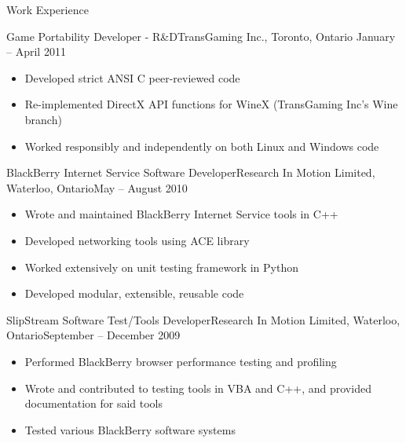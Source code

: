 \documentclass[11pt]{article}
\begin{document}
	\begin{section}{Work Experience} \\

        \begin{subsection}{Game Portability Developer - R\&D}{TransGaming Inc., Toronto, Ontario%
            }{January -- April 2011}

            \begin{itemize}
                \item Developed strict ANSI C peer-reviewed code
                \item Re-implemented DirectX API functions for WineX (TransGaming Inc's Wine branch) %
                \item Worked responsibly and independently on both Linux and Windows code
            \end{itemize}

        \end{subsection}

        \begin{subsection}{BlackBerry Internet Service Software Developer}{Research In Motion Limited, Waterloo, Ontario}{May -- August 2010}

            \begin{itemize}
                \item Wrote and maintained BlackBerry Internet Service tools in C++
                \item Developed networking tools using ACE library
                \item Worked extensively on unit testing framework in Python
                \item Developed modular, extensible, reusable code
            \end{itemize}

        \end{subsection}

		\begin{subsection}{SlipStream Software Test/Tools Developer}{Research In Motion Limited, Waterloo, Ontario}{September -- December 2009}

			\begin{itemize}
				\item Performed BlackBerry browser performance testing and profiling
				\item Wrote and contributed to testing tools in VBA and C++, and provided documentation for said tools
				\item Tested various BlackBerry software systems
			\end{itemize}


\end{subsection}
\end{section}
\end{document}
